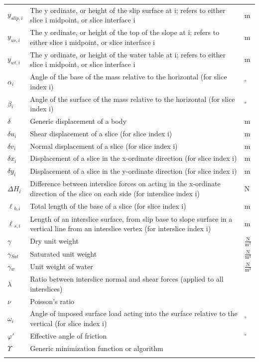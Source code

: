 \documentclass[12pt]{article}
\begin{document}
\begin{longtable*}{l l l}
\\
$y_{slip,i}$ & The y ordinate, or height of the slip surface at i; refers to either slice i midpoint, or slice interface i & m
\\
$y_{us,i}$ & The y ordinate, or height of the top of the slope at i; refers to either slice i midpoint, or slice interface i & m
\\
$y_{wt,i}$ & The y ordinate, or height of the water table at i; refers to either slice i midpoint, or slice interface i & m
\\
$\alpha{}_{i}$ & Angle of the base of the mass relative to the horizontal (for slice index i) & ${}^{\circ}$
\\
$\beta{}_{i}$ & Angle of the surface of the mass relative to the horizontal (for slice index i) & ${}^{\circ}$
\\
$\delta{}$ & Generic displacement of a body & m
\\
$\delta{}u_{i}$ & Shear displacement of a slice (for slice index i) & m
\\
$\delta{}v_{i}$ & Normal displacement of a slice (for slice index i) & m
\\
$\delta{}x_{i}$ & Displacement of a slice in the x-ordinate direction (for slice index i) & m
\\
$\delta{}y_{i}$ & Displacement of a slice in the y-ordinate direction (for slice index i) & m
\\
$\Delta{}H_{i}$ & Difference between interslice forces on acting in the x-ordinate direction of the slice on each side (for interslice index i) & N
\\
$\ell{}_{b,i}$ & Total length of the base of a slice (for slice index i) & m
\\
$\ell{}_{s,i}$ & Length of an interslice surface, from slip base to slope surface in a vertical line from an interslice vertex (for interslice index i) & m
\\
$\gamma{}$ & Dry unit weight & $\frac{\text{N}}{\text{m}^{3}}$
\\
$\gamma{}_{Sat}$ & Saturated unit weight & $\frac{\text{N}}{\text{m}^{3}}$
\\
$\gamma{}_{w}$ & Unit weight of water & $\frac{\text{N}}{\text{m}^{3}}$
\\
$\lambda{}$ & Ratio between interslice normal and shear forces (applied to all interslices) & 
\\
$\nu{}$ & Poisson's ratio & 
\\
$\omega{}_{i}$ & Angle of imposed surface load acting into the surface relative to the vertical (for slice index i) & ${}^{\circ}$
\\
$\varphi{}'$ & Effective angle of friction & ${}^{\circ}$
\\
$\Upsilon{}$ & Generic minimization function or algorithm & 
\\
\bottomrule
\label{Table:ToS}
\end{longtable*}
\end{document}
